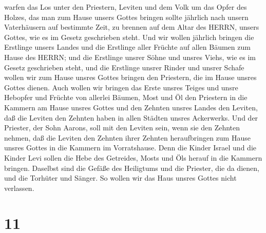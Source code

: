 warfen das Los unter den Priestern, Leviten und dem Volk um das Opfer
des Holzes, das man zum Hause unsers Gottes bringen sollte jährlich nach
unsern Vaterhäusern auf bestimmte Zeit, zu brennen auf dem Altar des
HERRN, unsers Gottes, wie es im Gesetz geschrieben steht. 
Und wir wollen jährlich bringen die Erstlinge unsers Landes und die
Erstlinge aller Früchte auf allen Bäumen zum Hause des HERRN;
 und die Erstlinge unsrer Söhne und unsres Viehs, wie es im
Gesetz geschrieben steht, und die Erstlinge unsrer Rinder und unsrer
Schafe wollen wir zum Hause unsres Gottes bringen den Priestern, die im
Hause unsres Gottes dienen.  Auch wollen wir bringen das
Erste unsres Teiges und unsre Hebopfer und Früchte von allerlei Bäumen,
Most und Öl den Priestern in die Kammern am Hause unsres Gottes und den
Zehnten unsres Landes den Leviten, daß die Leviten den Zehnten haben in
allen Städten unsres Ackerwerks.  Und der Priester, der
Sohn Aarons, soll mit den Leviten sein, wenn sie den Zehnten nehmen, daß
die Leviten den Zehnten ihrer Zehnten heraufbringen zum Hause unsres
Gottes in die Kammern im Vorratshause.  Denn die Kinder
Israel und die Kinder Levi sollen die Hebe des Getreides, Mosts und Öls
herauf in die Kammern bringen. Daselbst sind die Gefäße des Heiligtums
und die Priester, die da dienen, und die Torhüter und Sänger. So wollen
wir das Haus unsres Gottes nicht verlassen.

\hypertarget{section-10}{%
\section{11}\label{section-10}}

